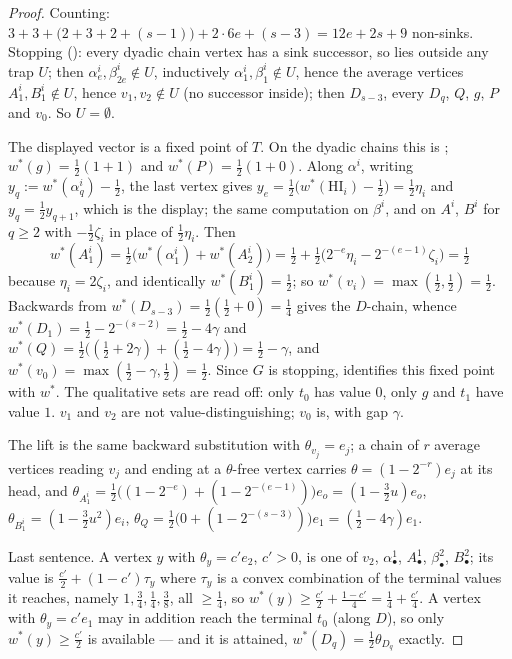 \documentclass[11pt]{article}
\theoremstyle{plain}
\theoremstyle{definition}
\begin{document}
\begin{proof}
Counting: $3+3+\bigl(2+3+2+(s-1)\bigr)+2\cdot6e+(s-3)=12e+2s+9$
non-sinks. Stopping (): every dyadic chain vertex has
a sink successor, so lies outside any trap $U$; then
$\alpha^{i}_e,\beta^{i}_{2e}\notin U$, inductively $\alpha^{i}_1,
\beta^{i}_1\notin U$, hence the average vertices $A^{i}_1,B^{i}_1\notin U$,
hence $v_1,v_2\notin U$ (no successor inside); then $D_{s-3}$, every
$D_q$, $Q$, $g$, $P$ and $v_0$. So $U=\emptyset$.

The displayed vector is a fixed point of $T$. On the dyadic chains this is
; $w^\ast(g)=\tfrac12(1+1)$ and $w^\ast(P)=\tfrac12(1+0)$.
Along $\alpha^{i}$, writing $y_q:=w^\ast(\alpha^{i}_q)-\tfrac12$, the last
vertex gives $y_e=\tfrac12\bigl(w^\ast(\mathrm{HI}_i)-\tfrac12\bigr)=\tfrac12\eta_i$
and $y_q=\tfrac12y_{q+1}$, which is the display; the same computation on
$\beta^{i}$, and on $A^{i}$, $B^{i}$ for $q\ge2$ with
$-\tfrac12\zeta_i$ in place of $\tfrac12\eta_i$. Then
\[
  w^\ast(A^{i}_1)=\tfrac12\bigl(w^\ast(\alpha^{i}_1)+w^\ast(A^{i}_2)\bigr)
  =\tfrac12+\tfrac12\bigl(2^{-e}\eta_i-2^{-(e-1)}\zeta_i\bigr)=\tfrac12
\]
because $\eta_i=2\zeta_i$, and identically $w^\ast(B^{i}_1)=\tfrac12$;
so $w^\ast(v_i)=\max(\tfrac12,\tfrac12)=\tfrac12$. Backwards from
$w^\ast(D_{s-3})=\tfrac12(\tfrac12+0)=\tfrac14$ gives the $D$-chain,
whence $w^\ast(D_1)=\tfrac12-2^{-(s-2)}=\tfrac12-4\gamma$ and
$w^\ast(Q)=\tfrac12\bigl((\tfrac12+2\gamma)+(\tfrac12-4\gamma)\bigr)
=\tfrac12-\gamma$, and $w^\ast(v_0)=\max(\tfrac12-\gamma,\tfrac12)=\tfrac12$.
Since $G$ is stopping,  identifies this fixed point
with $w^\ast$. The qualitative sets are read off: only $t_0$ has value
$0$, only $g$ and $t_1$ have value $1$. $v_1$ and $v_2$ are not
value-distinguishing; $v_0$ is, with gap $\gamma$.

The lift is the same backward substitution with $\theta_{v_j}=e_j$; a
chain of $r$ average vertices reading $v_j$ and ending at a
$\theta$-free vertex carries $\theta=(1-2^{-r})e_j$ at its head, and
$\theta_{A^{i}_1}=\tfrac12\bigl((1-2^{-e})+(1-2^{-(e-1)})\bigr)e_o
=(1-\tfrac32u)e_o$, $\theta_{B^{i}_1}=(1-\tfrac32u^{2})e_i$,
$\theta_Q=\tfrac12\bigl(0+(1-2^{-(s-3)})\bigr)e_1=(\tfrac12-4\gamma)e_1$.

Last sentence. A vertex $y$ with $\theta_y=c'e_2$, $c'>0$, is one of
$v_2$, $\alpha^{1}_\bullet$, $A^{1}_\bullet$, $\beta^{2}_\bullet$,
$B^{2}_\bullet$; its value is $\tfrac{c'}2+(1-c')\tau_y$ where $\tau_y$
is a convex combination of the terminal values it reaches, namely
$1,\tfrac34,\tfrac14,\tfrac38$, all $\ge\tfrac14$, so
$w^\ast(y)\ge\tfrac{c'}2+\tfrac{1-c'}4=\tfrac14+\tfrac{c'}4$. A vertex
with $\theta_y=c'e_1$ may in addition reach the terminal $t_0$ (along
$D$), so only $w^\ast(y)\ge\tfrac{c'}2$ is available --- and it is
attained, $w^\ast(D_q)=\tfrac12\theta_{D_q}$ exactly.
\end{proof}
\end{document}
